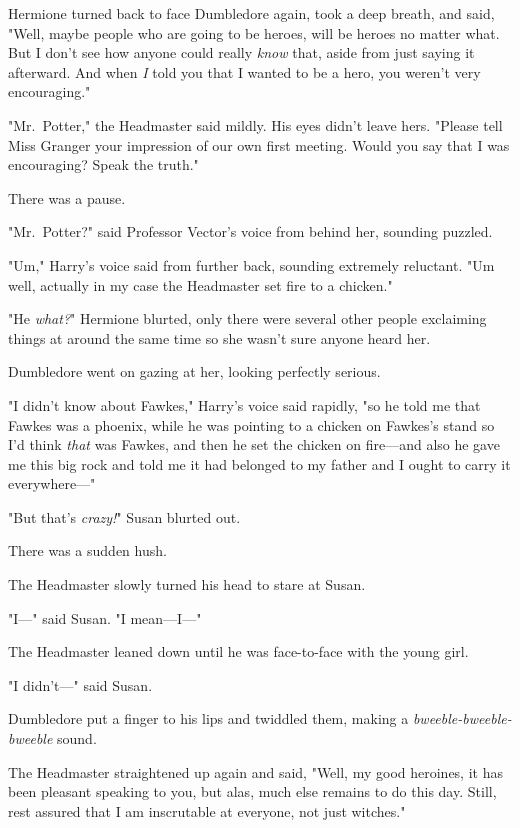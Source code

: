Hermione turned back to face Dumbledore again, took a deep breath, and said,
"Well, maybe people who are going to be heroes, will be heroes no matter what.
But I don't see how anyone could really \emph{know} that, aside from just
saying it afterward. And when \emph{I} told you that I wanted to be a hero, you
weren't very encouraging."

"Mr.~Potter," the Headmaster said mildly. His eyes didn't leave hers. "Please
tell Miss Granger your impression of our own first meeting. Would you say that
I was encouraging? Speak the truth."

There was a pause.

"Mr.~Potter?" said Professor Vector's voice from behind her, sounding puzzled.

"Um," Harry's voice said from further back, sounding extremely reluctant.
"Um{\el} well, actually in my case the Headmaster set fire to a chicken."

"He \emph{what?}" Hermione blurted, only there were several other people
exclaiming things at around the same time so she wasn't sure anyone heard her.

Dumbledore went on gazing at her, looking perfectly serious.

"I didn't know about Fawkes," Harry's voice said rapidly, "so he told me that
Fawkes was a phoenix, while he was pointing to a chicken on Fawkes's stand so
I'd think \emph{that} was Fawkes, and then he set the chicken on fire---and
also he gave me this big rock and told me it had belonged to my father and I
ought to carry it everywhere\mbox{---}"

"But that's \emph{crazy!}" Susan blurted out.

There was a sudden hush.

The Headmaster slowly turned his head to stare at Susan.

"I\mbox{---}" said Susan. "I mean---I\mbox{---}"

The Headmaster leaned down until he was face-to-face with the young girl.

"I didn't\mbox{---}" said Susan.

Dumbledore put a finger to his lips and twiddled them, making a
\emph{bweeble-bweeble-bweeble} sound.

The Headmaster straightened up again and said, "Well, my good heroines, it has
been pleasant speaking to you, but alas, much else remains to do this day.
Still, rest assured that I am inscrutable at everyone, not just witches."

